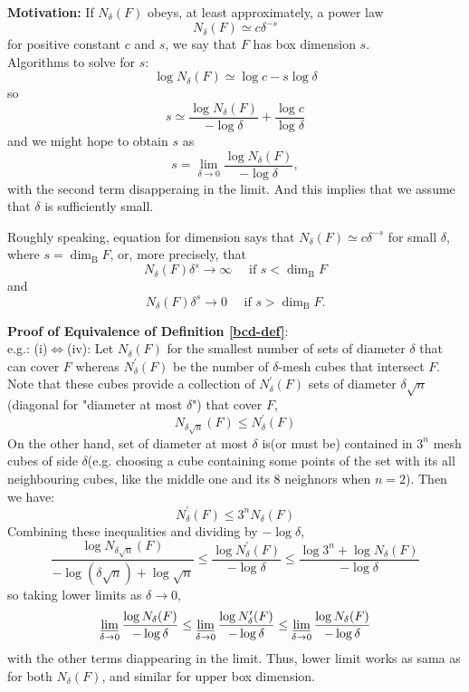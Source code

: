 \textbf{Motivation:}
If $N_\delta(F)$ obeys, at least approximately, a power law
$$N_{\delta}(F) \simeq c \delta^{-s}$$
for positive constant $c$ and $s$, we say that $F$ has box dimension $s$.
\\
Algorithms to solve for $s$:
$$
\log N_{\delta}(F) \simeq \log c-s \log \delta
$$
so
$$
s \simeq \frac{\log N_{\delta}(F)}{-\log \delta}+\frac{\log c}{\log \delta}
$$
and we might hope to obtain $s$ as
$$
s=\lim _{\delta \rightarrow 0} \frac{\log N_{\delta}(F)}{-\log \delta},
$$
with the second term disapperaing in the limit. And this implies that we assume that $\delta$ is sufficiently small. 


Roughly speaking, equation for dimension says that $N_{\delta}(F) \simeq c \delta^{-s}$ for small $\delta$, where $s=\operatorname{dim}_{\mathrm{B}} F$, or, more precisely, that
$$
N_{\delta}(F) \delta^{s} \rightarrow \infty \quad \text { if } s<\operatorname{dim}_{\mathrm{B}} F
$$
and
$$
N_{\delta}(F) \delta^{s} \rightarrow 0 \quad \text { if } s>\operatorname{dim}_{\mathrm{B}} F .
$$

\textbf{Proof of Equivalence of Definition \ref{bcd-def}}:\\
e.g.: (i)$\Leftrightarrow$(iv): Let $N_\delta(F)$ for the smallest number of sets of diameter $\delta$ that can cover $F$ whereas $N_\delta^\prime(F)$ be the number of $\delta$-mesh cubes that intersect $F$. 
Note that these cubes provide a collection of $N_\delta^\prime(F)$ sets of diameter $\delta\sqrt{n}$(diagonal for "diameter at most $\delta$") that cover $F$, $$N_{\delta\sqrt{n}}(F)\leq N_\delta^\prime(F)$$
On the other hand, set of diameter at most $\delta$ is(or must be) contained in $3^n$ mesh cubes of side $\delta$(e.g. choosing a cube containing some points of the set with its all neighbouring cubes, like the middle one and its 8 neighnors when $n=2$). Then we have:
$$ N_\delta^\prime(F) \leq 3^n N_\delta(F)$$
Combining these inequalities and dividing by $-\log \delta$,
$$
\frac{\log N_{\delta \sqrt{n}}(F)}{-\log (\delta \sqrt{n})+\log \sqrt{n}} \leq \frac{\log N_{\delta}^{\prime}(F)}{-\log \delta} \leq \frac{\log 3^{n}+\log N_{\delta}(F)}{-\log \delta}
$$
so taking lower limits as $\delta \rightarrow 0$,
$$\varliminf_{\delta \rightarrow 0} \frac{\log N_{\delta}(F)}{-\log \delta} \leq \varliminf_{\delta \rightarrow 0} \frac{\log N_{\delta}^{\prime}(F)}{-\log \delta} \leq \varliminf_{\delta \rightarrow 0} \frac{\log N_{\delta}(F)}{-\log \delta}$$
with the other terms diappearing in the limit. Thus, lower limit works as sama as for both $N_\delta(F)$, and similar for upper box dimension. 

